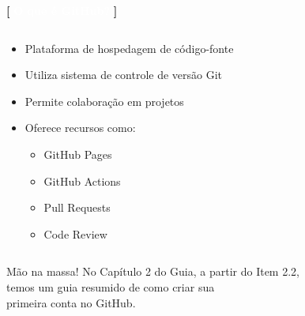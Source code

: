 \documentclass[10pt, brazil]{beamer}
\begin{document}
\begin{frame}{\textcolor{lightpurple}{\textbf{[}} \textbf{\textcolor{white}{O que é GitHub?}} \textcolor{lightpurple}{\textbf{]}}}
  
  \begin{columns}
    \begin{column}{0.6\textwidth}
      \begin{itemize}
        \item Plataforma de hospedagem de código-fonte
        \item Utiliza sistema de controle de versão Git
        \item Permite colaboração em projetos
        \item Oferece recursos como:
        \begin{itemize}
          \item GitHub Pages
          \item GitHub Actions
          \item Pull Requests
          \item Code Review
        \end{itemize}
      \end{itemize}
    \end{column}
  \end{columns}
  \begin{alertblock}{Mão na massa!}
    No Capítulo 2 do Guia, a partir do Item 2.2,\\
    temos um guia resumido de como criar sua\\
    primeira conta no GitHub.
  \end{alertblock}

\end{frame}
\end{document}
